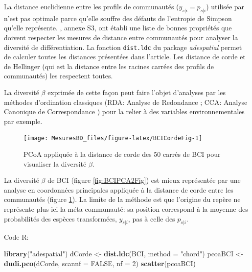 \documentclass[
  11pt,
  french,
  a4paper,
  extrafontsizes,onecolumn,openright
  ]{memoir}
\newenvironment{Shaded}{\begin{snugshade}}{\end{snugshade}}
\newcommand{\DataTypeTok}[1]{\textcolor[rgb]{0.13,0.29,0.53}{#1}}
\newcommand{\DecValTok}[1]{\textcolor[rgb]{0.00,0.00,0.81}{#1}}
\newcommand{\KeywordTok}[1]{\textcolor[rgb]{0.13,0.29,0.53}{\textbf{#1}}}
\newcommand{\NormalTok}[1]{#1}
\newcommand{\OtherTok}[1]{\textcolor[rgb]{0.56,0.35,0.01}{#1}}
\newcommand{\StringTok}[1]{\textcolor[rgb]{0.31,0.60,0.02}{#1}}
\begin{document}
La distance euclidienne entre les profils de communautés (\(y_{s|i} = p_{s|i}\)) utilisée par \textcite{terBraak1983} n'est pas optimale parce qu'elle souffre des défauts de l'entropie de Simpson \autocite{Jost2007} qu'elle représente.
\textcite{Legendre2013}, annexe S3, ont établi une liste de bonnes propriétés que doivent respecter les mesures de distance entre communautés pour analyser la diversité de différentiation.
La fonction \texttt{dist.ldc} du package \emph{adespatial} permet de calculer toutes les distances présentées dans l'article.
Les distance de corde et de Hellinger (qui est la distance entre les racines carrées des profils de communautés) les respectent toutes.

La diversité \(\beta\) exprimée de cette façon peut faire l'objet d'analyses par les méthodes d'ordination classiques (RDA: Analyse de Redondance \autocite{Rao1964}; CCA: Analyse Canonique de Correspondance \autocite{Braak1986}) pour la relier à des variables environnementales par exemple\autocite{Legendre2013}.



\scriptsize

\begin{figure}

{\centering \texttt{[image: MesuresBD\_files/figure-latex/BCICordeFig-1]} 

}

\caption{PCoA appliquée à la distance de corde des 50 carrés de BCI pour visualiser la diversité \(\beta\).}\label{fig:BCICordeFig}
\end{figure}

\normalsize

La diversité \(\beta\) de BCI (figure \ref{fig:BCIPCA2Fig}) est mieux représentée par une analyse en coordonnées principales appliquée à la distance de corde entre les communautés (figure \ref{fig:BCICordeFig}).
La limite de la méthode est que l'origine du repère ne représente plus ici la méta-communauté: sa position correspond à la moyenne des probabilités des espèces transformées, \(y_{s|i}\), pas à celle des \(p_{s|i}\).

Code R:

\scriptsize

\begin{Shaded}
\begin{Highlighting}[]
\KeywordTok{library}\NormalTok{(}\StringTok{"adespatial"}\NormalTok{)}
\NormalTok{dCorde <-}\StringTok{ }\KeywordTok{dist.ldc}\NormalTok{(BCI, }\DataTypeTok{method =} \StringTok{"chord"}\NormalTok{)}
\NormalTok{pcoaBCI <-}\StringTok{ }\KeywordTok{dudi.pco}\NormalTok{(dCorde, }\DataTypeTok{scannf =} \OtherTok{FALSE}\NormalTok{, }\DataTypeTok{nf =} \DecValTok{2}\NormalTok{)}
\KeywordTok{scatter}\NormalTok{(pcoaBCI)}
\end{Highlighting}
\end{Shaded}
\end{document}
